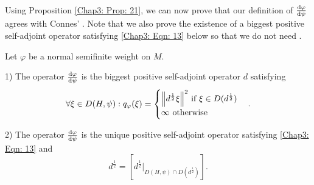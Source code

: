 Using Proposition \ref{Chap3: Prop: 21}, we can now prove that our definition of $\dv{\varphi}{\psi}$ agrees with Connes' \cite{1}. Note that we also prove the existence of a biggest positive self-adjoint operator satisfying \eqref{Chap3: Eqn: 13} below so that we do not need \cite[Lemma 5]{1}.
\begin{proposition}\label{Chap3: Prop: 22}
    Let $\varphi$ be a normal semifinite weight on $M$.\par
    1) The operator $\dv{\varphi}{\psi}$ is the biggest positive self-adjoint operator $d$ satisfying
    \begin{equation}\label{Chap3: Eqn: 13}
        \forall \xi\in D(H,\psi):q_\varphi(\xi)=\begin{cases}
            \norm{d^\frac{1}{2}\xi}^2\text{ if }\xi\in D(d^\frac{1}{2}) \\
            \infty\text{ otherwise }
        \end{cases}.
    \end{equation}\par
    2) The operator $\dv{\varphi}{\psi}$ is the unique positive self-adjoint operator satisfying \eqref{Chap3: Eqn: 13} and
    \begin{equation}\label{Chap3: Eqn: 14}
        d^\frac{1}{2}=\left[ d^\frac{1}{2}|_{D(H,\psi)\cap D(d^\frac{1}{2})} \right].
    \end{equation}
\end{proposition}
